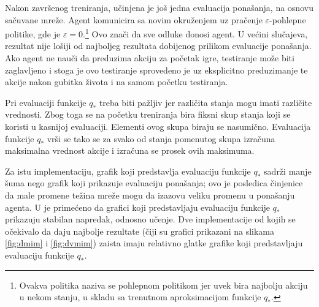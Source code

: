 \par  
Nakon završenog treniranja, učinjena je još jedna evaluacija ponašanja, na osnovu sačuvane mreže. Agent komunicira sa novim okruženjem uz pračenje $\varepsilon$-pohlepne politike, gde je $\varepsilon=0$.\footnote{Ovakva politika naziva se pohlepnom politikom jer uvek bira najbolju akciju u nekom stanju, u skladu sa trenutnom aproksimacijom funkcije $q_*$.} Ovo znači da sve odluke donosi agent. U većini slučajeva, rezultat nije lošiji od najboljeg rezultata dobijenog prilikom evaluacije ponašanja. Ako agent ne nauči da preduzima akciju za početak igre, testiranje može biti zaglavljeno i stoga je ovo testiranje sprovedeno je uz eksplicitno preduzimanje te akcije nakon gubitka života i na samom početku testiranja.
\par  
Pri evaluaciji funkcije $q_*$ treba biti pažljiv jer različita stanja mogu imati različite vrednosti. Zbog toga se na početku treniranja bira fiksni skup stanja koji se koristi u kasnijoj evaluaciji. Elementi ovog skupa biraju se nasumično. Evaluacija funkcije $q_*$ vrši se tako se za svako od stanja pomenutog skupa izračuna maksimalna vrednost akcije i izračuna se prosek ovih maksimuma. 
\par 
Za istu implementaciju, grafik koji predstavlja evaluaciju funkcije $q_*$ sadrži manje šuma nego grafik koji prikazuje evaluaciju ponašanja; ovo je posledica činjenice da male promene težina mreže mogu da izazovu veliku promenu u ponašanju agenta. U \cite{dqn_mnih} je primećeno da grafici koji predstavljaju evaluaciju funkcije $q_*$ prikazuju stabilan napredak, odnosno učenje. Dve implementacije od kojih se očekivalo da daju najbolje rezultate (čiji su grafici prikazani na slikama \ref{fig:dmim} i \ref{fig:dvmim}) zaista imaju relativno glatke grafike koji predstavljaju evaluaciju funkcije $q_*$.
\par 
